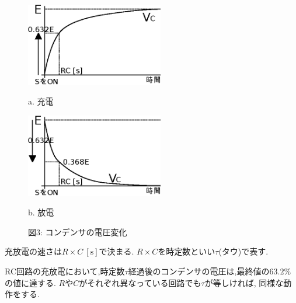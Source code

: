 \documentclass[uplatex]{jsarticle}
\begin{document}
		\begin{figure}[H]
			\begin{minipage}{0.5\hsize}
				\begin{center}
					\includegraphics[width = 6cm]{3-a.eps}
				\end{center}
				\captionsetup{labelformat=empty,labelsep=none}
				\caption{a. 充電}
			\end{minipage}
			\begin{minipage}{0.5\hsize}
				\begin{center}
					\includegraphics[width = 6cm]{3-b.eps}
				\end{center}
				\captionsetup{labelformat=empty,labelsep=none}
				\caption{b. 放電}
			\end{minipage}
			\captionsetup{labelformat=empty,labelsep=none}
			\caption{図3: コンデンサの電圧変化}
		\end{figure}
		充放電の速さは$R \times C \ [\mathrm s]$で決まる. $R \times C$を時定数といい$\tau$(タウ)で表す.\par
		RC回路の充放電において,時定数$\tau$経過後のコンデンサの電圧は,最終値の$63.2 \%$の値に達する. $R$や$C$がそれぞれ異なっている回路でも$\tau$が等しければ,
		同様な動作をする.
\end{document}
